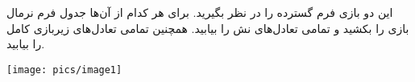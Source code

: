 این دو بازی فرم گسترده را در نظر بگیرید. برای هر کدام از آن‌ها جدول فرم نرمال بازی را بکشید و تمامی تعادل‌های نش را بیابید. همچنین تمامی تعادل‌های زیربازی کامل را بیابید.
\begin{center}
    \texttt{[image: pics/image1]}
\end{center}